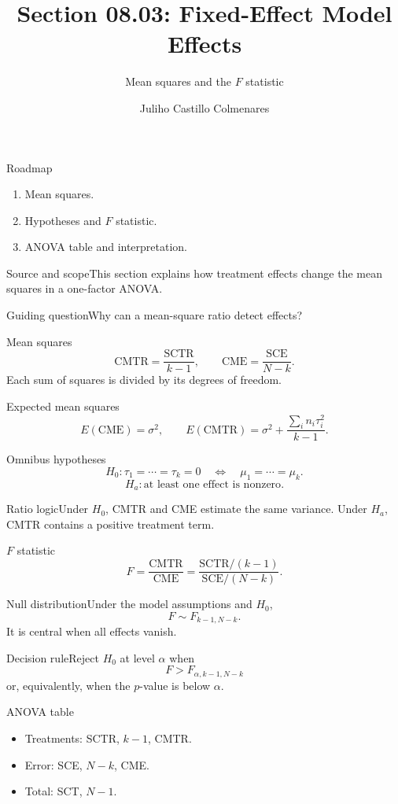\documentclass[10pt,aspectratio=169]{beamer}
\title[Fixed-effect effects]{Section 08.03: Fixed-Effect Model Effects}\subtitle{Mean squares and the $F$ statistic}
\author[J. Castillo Colmenares]{Juliho Castillo Colmenares}\institute{Tecnológico de Monterrey}\date{}
\begin{document}
\begin{frame}[plain]\titlepage\end{frame}
\begin{frame}{Roadmap}\small\begin{enumerate}\item Mean squares.\item Hypotheses and $F$ statistic.\item ANOVA table and interpretation.\end{enumerate}\end{frame}
\begin{frame}{Source and scope}\small This section explains how treatment effects change the mean squares in a one-factor ANOVA.\begin{block}{Guiding question}Why can a mean-square ratio detect effects?\end{block}\end{frame}
\begin{frame}{Mean squares}\small\[\text{CMTR}=\frac{\text{SCTR}}{k-1},\qquad \text{CME}=\frac{\text{SCE}}{N-k}.\]Each sum of squares is divided by its degrees of freedom.\end{frame}
\begin{frame}{Expected mean squares}\small\[E(\text{CME})=\sigma^2,\qquad E(\text{CMTR})=\sigma^2+\frac{\sum_i n_i\tau_i^2}{k-1}.\]\end{frame}
\begin{frame}{Omnibus hypotheses}\small\[H_0:\tau_1=\cdots=\tau_k=0\quad\Longleftrightarrow\quad\mu_1=\cdots=\mu_k.\]\[H_a:\text{at least one effect is nonzero}.\]\end{frame}
\begin{frame}{Ratio logic}\small Under $H_0$, CMTR and CME estimate the same variance. Under $H_a$, CMTR contains a positive treatment term.\end{frame}
\begin{frame}{$F$ statistic}\small\[F=\frac{\text{CMTR}}{\text{CME}}=\frac{\text{SCTR}/(k-1)}{\text{SCE}/(N-k)}.\]\end{frame}
\begin{frame}{Null distribution}\small Under the model assumptions and $H_0$,\[F\sim F_{k-1,N-k}.\]It is central when all effects vanish.\end{frame}
\begin{frame}{Decision rule}\small Reject $H_0$ at level $\alpha$ when\[F>F_{\alpha,k-1,N-k}\]or, equivalently, when the $p$-value is below $\alpha$.\end{frame}
\begin{frame}{ANOVA table}\small\begin{itemize}\item Treatments: SCTR, $k-1$, CMTR.\item Error: SCE, $N-k$, CME.\item Total: SCT, $N-1$.\end{itemize}\end{frame}
\end{document}
